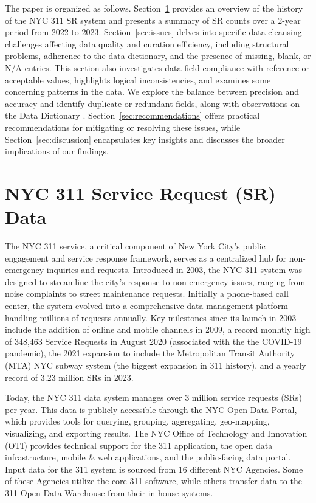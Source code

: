 \documentclass[linenumber]{jdsart}
\begin{document}
The paper is organized as follows. Section~\ref{sec:data} provides 
an overview of the history of the NYC 311 SR system and presents 
a summary of SR counts over a 2-year period from 2022 to 2023. 
Section~\ref{sec:issues} delves into specific data cleansing 
challenges affecting data quality and curation efficiency, 
including structural problems, adherence to the data dictionary, 
and the presence of missing, blank, or N/A entries. This section
 also investigates data field compliance with reference or acceptable values, 
highlights logical inconsistencies, and examines some concerning patterns 
in the data. We explore the balance between precision and accuracy 
and identify duplicate or redundant fields, along with observations 
on the Data Dictionary \citep{datadictionaryNYC}.
Section~\ref{sec:recommendations} offers 
practical recommendations for mitigating or resolving these issues, 
while Section~\ref{sec:discussion} encapsulates key insights and 
discusses the broader implications of our findings.


\section{NYC 311 Service Request (SR) Data} 
\label{sec:data}

The NYC 311 service, a critical component of New York City's public
engagement and service response framework, serves as a centralized hub
for non-emergency inquiries and requests. Introduced in 2003, the NYC
311 system was designed to streamline the city's response to
non-emergency issues, ranging from noise complaints to street
maintenance requests. Initially a phone-based call center, the system
evolved into a comprehensive data management platform handling
millions of requests annually. Key milestones since its launch in 2003
include the addition of online and mobile channels in 2009, a
record monhtly high of 348,463 Service Requests in 
August 2020 (associated with the the COVID-19 
pandemic), the 2021 expansion to include the 
Metropolitan Transit Authority (MTA) NYC subway 
system (the biggest expansion in 311 history), 
and a yearly record of 3.23 million SRs in 2023.


Today, the NYC 311 data system manages over 3 million service
requests (SRs) per year. This data is publicly accessible 
through the NYC Open Data Portal, which provides 
tools for querying, grouping, aggregating,
geo-mapping, visualizing, and exporting results. The
NYC Office of Technology and Innovation (OTI) provides technical support for 
the 311 application, the open data infrastructure, mobile \& web applications, 
and the public-facing data portal. Input data for the 311 system 
is sourced from 16 different NYC Agencies. Some of these Agencies
utilize the core 311 software, while others transfer data to the
311 Open Data Warehouse from their in-house systems.
\end{document}
